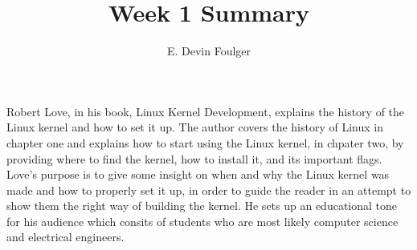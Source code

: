 \documentclass[letterpaper, 10pt, titlepage]{article}
\def\name{E. Devin Foulger}
\begin{document}
\title{Week 1 Summary}
\author{\name}

\maketitle

Robert Love, in his book, Linux Kernel Development, explains the history of the Linux kernel and how to set it up. 
The author covers the history of Linux in chapter one and explains how to start using the Linux kernel, in chpater two,
by providing where to find the kernel, how to install it, and its important flags. Love's purpose is to give some
insight on when and why the Linux kernel was made and how to properly set it up, in order to guide the reader in an
attempt to show them the right way of building the kernel. He sets up an educational tone for his audience which 
consits of students who are most likely computer science and electrical engineers.
\end{document}
